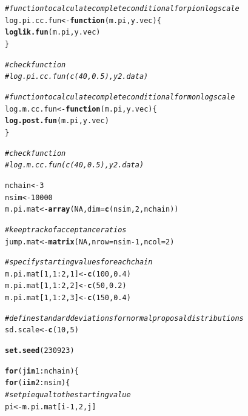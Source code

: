 \documentclass[12pt]{article}\usepackage[]{graphicx}\usepackage[]{color}
\makeatletter
\newcommand{\hlnum}[1]{\textcolor[rgb]{0.686,0.059,0.569}{#1}}%
\newcommand{\hlcom}[1]{\textcolor[rgb]{0.678,0.584,0.686}{\textit{#1}}}%
\newcommand{\hlopt}[1]{\textcolor[rgb]{0,0,0}{#1}}%
\newcommand{\hlstd}[1]{\textcolor[rgb]{0.345,0.345,0.345}{#1}}%
\newcommand{\hlkwa}[1]{\textcolor[rgb]{0.161,0.373,0.58}{\textbf{#1}}}%
\newcommand{\hlkwb}[1]{\textcolor[rgb]{0.69,0.353,0.396}{#1}}%
\newcommand{\hlkwc}[1]{\textcolor[rgb]{0.333,0.667,0.333}{#1}}%
\newcommand{\hlkwd}[1]{\textcolor[rgb]{0.737,0.353,0.396}{\textbf{#1}}}%
\newenvironment{kframe}{%
 \def\at@end@of@kframe{}%
 \ifinner\ifhmode%
  \def\at@end@of@kframe{\end{minipage}}%
  \begin{minipage}{\columnwidth}%
 \fi\fi%
 \def\FrameCommand##1{\hskip\@totalleftmargin \hskip-\fboxsep
 \colorbox{shadecolor}{##1}\hskip-\fboxsep
     \hskip-\linewidth \hskip-\@totalleftmargin \hskip\columnwidth}%
 \MakeFramed {\advance\hsize-\width
   \@totalleftmargin\z@ \linewidth\hsize
   \@setminipage}}%
 {\par\unskip\endMakeFramed%
 \at@end@of@kframe}
\newenvironment{knitrout}{}{} %
\makeatother
\begin{document}
\begin{enumerate}
\begin{enumerate}
\begin{enumerate}
\begin{knitrout}\footnotesize
{}\color{fgcolor}\begin{kframe}
\begin{alltt}
\hlcom{#function to calculate complete conditional for pi on log scale}
\hlstd{log.pi.cc.fun} \hlkwb{<-} \hlkwa{function}\hlstd{(}\hlkwc{m.pi}\hlstd{,} \hlkwc{y.vec}\hlstd{)\{}
  \hlkwd{loglik.fun}\hlstd{(m.pi, y.vec)}
\hlstd{\}}

\hlcom{#check function}
\hlcom{#log.pi.cc.fun(c(40, 0.5), y2.data)}

\hlcom{#function to calculate complete conditional for m on log scale}
\hlstd{log.m.cc.fun} \hlkwb{<-} \hlkwa{function}\hlstd{(}\hlkwc{m.pi}\hlstd{,} \hlkwc{y.vec}\hlstd{)\{}
  \hlkwd{log.post.fun}\hlstd{(m.pi, y.vec)}
\hlstd{\}}

\hlcom{#check function}
\hlcom{#log.m.cc.fun(c(40, 0.5), y2.data)}

\hlstd{nchain} \hlkwb{<-} \hlnum{3}
\hlstd{nsim} \hlkwb{<-} \hlnum{10000}
\hlstd{m.pi.mat} \hlkwb{<-} \hlkwd{array}\hlstd{(}\hlnum{NA}\hlstd{,} \hlkwc{dim}\hlstd{=}\hlkwd{c}\hlstd{(nsim,} \hlnum{2}\hlstd{, nchain))}

\hlcom{#keep track of acceptance ratios}
\hlstd{jump.mat} \hlkwb{<-} \hlkwd{matrix}\hlstd{(}\hlnum{NA}\hlstd{,} \hlkwc{nrow}\hlstd{=nsim}\hlopt{-}\hlnum{1}\hlstd{,} \hlkwc{ncol}\hlstd{=}\hlnum{2}\hlstd{)}

\hlcom{#specify starting values for each chain}
\hlstd{m.pi.mat[}\hlnum{1}\hlstd{,} \hlnum{1}\hlopt{:}\hlnum{2}\hlstd{,} \hlnum{1}\hlstd{]} \hlkwb{<-} \hlkwd{c}\hlstd{(}\hlnum{100}\hlstd{,} \hlnum{0.4}\hlstd{)}
\hlstd{m.pi.mat[}\hlnum{1}\hlstd{,} \hlnum{1}\hlopt{:}\hlnum{2}\hlstd{,} \hlnum{2}\hlstd{]} \hlkwb{<-} \hlkwd{c}\hlstd{(}\hlnum{50}\hlstd{,} \hlnum{0.2}\hlstd{)}
\hlstd{m.pi.mat[}\hlnum{1}\hlstd{,} \hlnum{1}\hlopt{:}\hlnum{2}\hlstd{,} \hlnum{3}\hlstd{]} \hlkwb{<-} \hlkwd{c}\hlstd{(}\hlnum{150}\hlstd{,} \hlnum{0.4}\hlstd{)}

\hlcom{#define standard deviations for normal proposal distributions}
\hlstd{sd.scale} \hlkwb{<-} \hlkwd{c}\hlstd{(}\hlnum{10}\hlstd{,} \hlnum{5}\hlstd{)}

\hlkwd{set.seed}\hlstd{(}\hlnum{230923}\hlstd{)}

\hlkwa{for} \hlstd{(j} \hlkwa{in} \hlnum{1}\hlopt{:}\hlstd{nchain) \{}
  \hlkwa{for} \hlstd{(i} \hlkwa{in} \hlnum{2}\hlopt{:}\hlstd{nsim) \{}
    \hlcom{#set pi equal to the starting value}
    \hlstd{pi} \hlkwb{<-} \hlstd{m.pi.mat[i}\hlopt{-}\hlnum{1}\hlstd{,} \hlnum{2}\hlstd{, j]}


\end{alltt}
\end{kframe}
\end{knitrout}
\end{enumerate}
\end{enumerate}
\end{enumerate}
\end{document}
